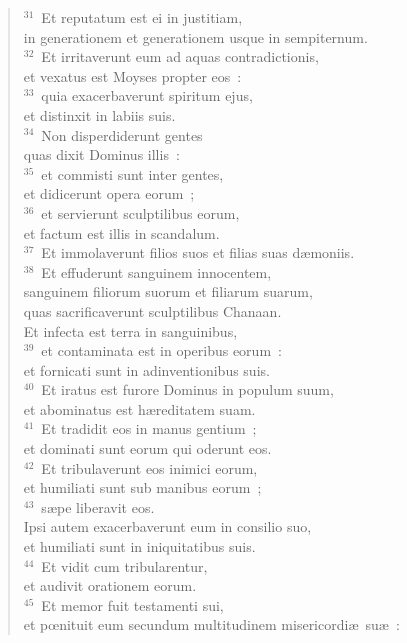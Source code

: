\begin{verse}
${}^{31}$~Et reputatum est ei in justitiam,\\ in generationem et generationem usque in sempiternum.\\
${}^{32}$~Et irritaverunt eum ad aquas contradictionis,\\ et vexatus est Moyses propter eos~:\\
${}^{33}$~quia exacerbaverunt spiritum ejus,\\ et distinxit in labiis suis.\\
${}^{34}$~Non disperdiderunt gentes\\ quas dixit Dominus illis~:\\
${}^{35}$~et commisti sunt inter gentes,\\ et didicerunt opera eorum~;\\
${}^{36}$~et servierunt sculptilibus eorum,\\ et factum est illis in scandalum.\\
${}^{37}$~Et immolaverunt filios suos et filias suas d\ae moniis.\\
${}^{38}$~Et effuderunt sanguinem innocentem,\\ sanguinem filiorum suorum et filiarum suarum,\\ quas sacrificaverunt sculptilibus Chanaan.\\ Et infecta est terra in sanguinibus,\\
${}^{39}$~et contaminata est in operibus eorum~:\\ et fornicati sunt in adinventionibus suis.\\
${}^{40}$~Et iratus est furore Dominus in populum suum,\\ et abominatus est h\ae reditatem suam.\\
${}^{41}$~Et tradidit eos in manus gentium~;\\ et dominati sunt eorum qui oderunt eos.\\
${}^{42}$~Et tribulaverunt eos inimici eorum,\\ et humiliati sunt sub manibus eorum~;\\
${}^{43}$~s\ae pe liberavit eos.\\ Ipsi autem exacerbaverunt eum in consilio suo,\\ et humiliati sunt in iniquitatibus suis.\\
${}^{44}$~Et vidit cum tribularentur,\\ et audivit orationem eorum.\\
${}^{45}$~Et memor fuit testamenti sui,\\ et pœnituit eum secundum multitudinem misericordi\ae\ su\ae~:\\

\end{verse}

